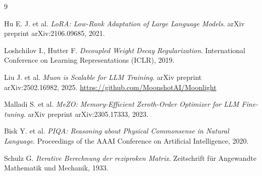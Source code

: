 \documentclass[a4paper,12pt]{article}
\begin{document}
\begin{thebibliography}{9}

Hu E. J. et al. 
\textit{LoRA: Low-Rank Adaptation of Large Language Models}. 
arXiv preprint arXiv:2106.09685, 2021.

Loshchilov I., Hutter F. 
\textit{Decoupled Weight Decay Regularization}. 
International Conference on Learning Representations (ICLR), 2019.

Liu J. et al. 
\textit{Muon is Scalable for LLM Training}. 
arXiv preprint arXiv:2502.16982, 2025. 
\url{https://github.com/MoonshotAI/Moonlight}

Malladi S. et al. 
\textit{MeZO: Memory-Efficient Zeroth-Order Optimizer for LLM Fine-tuning}. 
arXiv preprint arXiv:2305.17333, 2023.

Bisk Y. et al. 
\textit{PIQA: Reasoning about Physical Commonsense in Natural Language}. 
Proceedings of the AAAI Conference on Artificial Intelligence, 2020.

Schulz G. 
\textit{Iterative Berechnung der reziproken Matrix}. 
Zeitschrift für Angewandte Mathematik und Mechanik, 1933.

\end{thebibliography}
\end{document}
